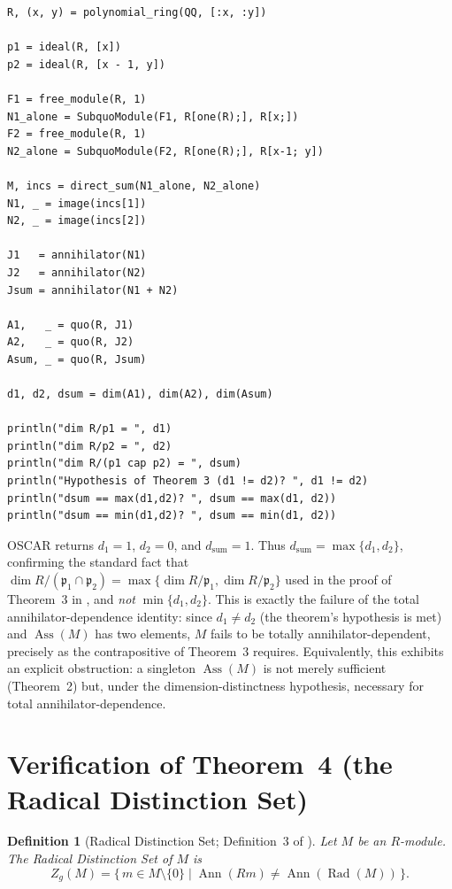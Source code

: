 \documentclass[11pt]{article}
\newtheorem{definition}{Definition}
\newcommand{\Ann}{\operatorname{Ann}}
\newcommand{\Rad}{\operatorname{Rad}}
\newcommand{\Ass}{\operatorname{Ass}}
\begin{document}
\begin{lstlisting}
R, (x, y) = polynomial_ring(QQ, [:x, :y])

p1 = ideal(R, [x])
p2 = ideal(R, [x - 1, y])

F1 = free_module(R, 1)
N1_alone = SubquoModule(F1, R[one(R);], R[x;])
F2 = free_module(R, 1)
N2_alone = SubquoModule(F2, R[one(R);], R[x-1; y])

M, incs = direct_sum(N1_alone, N2_alone)
N1, _ = image(incs[1])
N2, _ = image(incs[2])

J1   = annihilator(N1)
J2   = annihilator(N2)
Jsum = annihilator(N1 + N2)

A1,   _ = quo(R, J1)
A2,   _ = quo(R, J2)
Asum, _ = quo(R, Jsum)

d1, d2, dsum = dim(A1), dim(A2), dim(Asum)

println("dim R/p1 = ", d1)
println("dim R/p2 = ", d2)
println("dim R/(p1 cap p2) = ", dsum)
println("Hypothesis of Theorem 3 (d1 != d2)? ", d1 != d2)
println("dsum == max(d1,d2)? ", dsum == max(d1, d2))
println("dsum == min(d1,d2)? ", dsum == min(d1, d2))
\end{lstlisting}

OSCAR returns $d_1=1$, $d_2=0$, and $d_{\mathrm{sum}}=1$. Thus
$d_{\mathrm{sum}}=\max\{d_1,d_2\}$, confirming the standard fact that
$\dim R/(\mathfrak p_1\cap\mathfrak p_2)=\max\{\dim R/\mathfrak
p_1,\dim R/\mathfrak p_2\}$ used in the proof of Theorem~3 in
\cite{pekin-ozkaya-2026}, and \emph{not} $\min\{d_1,d_2\}$. This is
exactly the failure of the total annihilator-dependence identity: since
$d_1\neq d_2$ (the theorem's hypothesis is met) and $\Ass(M)$ has two
elements, $M$ fails to be totally annihilator-dependent, precisely as the
contrapositive of Theorem~3 requires. Equivalently, this exhibits an
explicit obstruction: a singleton $\Ass(M)$ is not merely sufficient
(Theorem~2) but, under the dimension-distinctness hypothesis, necessary
for total annihilator-dependence.

\section{Verification of Theorem~4 (the Radical Distinction Set)}

\begin{definition}[Radical Distinction Set; Definition~3 of \cite{pekin-ozkaya-2026}]
Let $M$ be an $R$-module. The Radical Distinction Set of $M$ is
\[
  Z_g(M) = \{\, m\in M\setminus\{0\} \mid \Ann(Rm) \neq \Ann(\Rad(M))\,\}.
\]
\end{definition}
\end{document}
